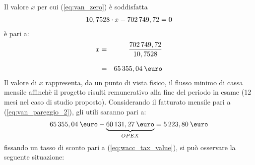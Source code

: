 Il valore $x$ per cui (\ref{eq:van_zero}) è soddisfatta 
	\begin{equation}
	\label{eq:van_pareggio_1}
	\begin{split}
 		10,7528 \cdot x - 702\thinspace 749,72 = 0	
 	\end{split}
	\end{equation}
è pari a:
	\begin{eqnarray}
	\label{eq:van_pareggio_2}
		x & = & \frac{702\thinspace 749,72	}{10,7528}	 	\nonumber \\[1.5ex] 
		  & = &  65\thinspace 355,04 \: \mbox{\euro} 
	\end{eqnarray}
Il valore di $x$ rappresenta, da un punto di vista fisico, il flusso minimo di cassa mensile affinchè il progetto risulti remunerativo alla fine del periodo in esame (12 mesi nel caso di studio proposto). \newline
Considerando il fatturato mensile pari a (\ref{eq:van_pareggio_2}), gli utili saranno pari a:
	\begin{equation}
	\label{eq:flussi_netti}
	\begin{split}
 		65\thinspace 355,04 \: \mbox{\euro} - \underbrace{60\thinspace 131,27 \: \mbox{\euro}}_{OPEX} = 5\thinspace 223,80 \: \mbox{\euro}	
 	\end{split}
	\end{equation}
fissando un tasso di sconto pari a (\ref{eq:wacc_tax_value}), si può osservare la seguente situazione:
%
%
